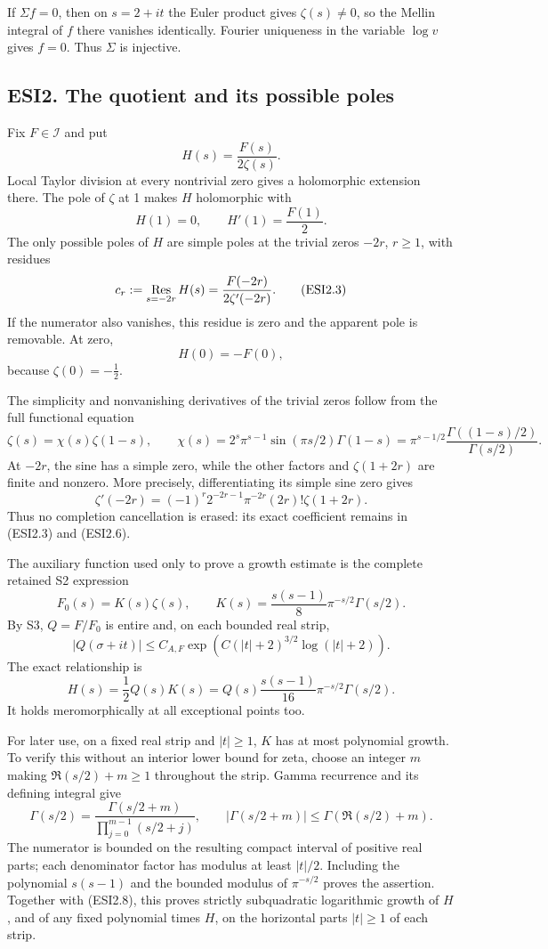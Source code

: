 If \(\Sigma f=0\), then on \(s=2+it\) the Euler product gives
\(\zeta(s)\ne0\), so the Mellin integral of \(f\) there vanishes
identically. Fourier uniqueness in the variable \(\log v\) gives
\(f=0\). Thus \(\Sigma\) is injective.

\subsection{ESI2. The quotient and its possible
poles}\label{esi2.-the-quotient-and-its-possible-poles}

Fix \(F\in\mathcal I\) and put \[
H(s)=\frac{F(s)}{2\zeta(s)}.
\tag{ESI2.1}
\] Local Taylor division at every nontrivial zero gives a holomorphic
extension there. The pole of \(\zeta\) at 1 makes \(H\) holomorphic with
\[
H(1)=0,\qquad H'(1)=\frac{F(1)}2.
\tag{ESI2.2}
\] The only possible poles of \(H\) are simple poles at the trivial
zeros \(-2r\), \(r\ge1\), with residues \[
c_r:=\mathop{\rm Res}_{s=-2r}H(s)
=\frac{F(-2r)}{2\zeta'(-2r)}.
\tag{ESI2.3}
\] If the numerator also vanishes, this residue is zero and the apparent
pole is removable. At zero, \[
H(0)=-F(0),
\tag{ESI2.4}
\] because \(\zeta(0)=-\tfrac12\).

The simplicity and nonvanishing derivatives of the trivial zeros follow
from the full functional equation \[
\zeta(s)=\chi(s)\zeta(1-s),\qquad
\chi(s)=2^s\pi^{s-1}\sin(\pi s/2)\Gamma(1-s)
=\pi^{s-1/2}\frac{\Gamma((1-s)/2)}{\Gamma(s/2)}.
\tag{ESI2.5}
\] At \(-2r\), the sine has a simple zero, while the other factors and
\(\zeta(1+2r)\) are finite and nonzero. More precisely, differentiating
its simple sine zero gives \[
\zeta'(-2r)=(-1)^r2^{-2r-1}\pi^{-2r}(2r)!\zeta(1+2r).
\tag{ESI2.6}
\] Thus no completion cancellation is erased: its exact coefficient
remains in (ESI2.3) and (ESI2.6).

The auxiliary function used only to prove a growth estimate is the
complete retained S2 expression \[
F_0(s)=K(s)\zeta(s),\qquad
K(s)=\frac{s(s-1)}8\pi^{-s/2}\Gamma(s/2).
\tag{ESI2.7}
\] By S3, \(Q=F/F_0\) is entire and, on each bounded real strip, \[
|Q(\sigma+it)|\le C_{A,F}
\exp\!\left(C(|t|+2)^{3/2}\log(|t|+2)\right).
\tag{ESI2.8}
\] The exact relationship is \[
H(s)=\frac12Q(s)K(s)
=Q(s)\frac{s(s-1)}{16}\pi^{-s/2}\Gamma(s/2).
\tag{ESI2.9}
\] It holds meromorphically at all exceptional points too.

For later use, on a fixed real strip and \(|t|\ge1\), \(K\) has at most
polynomial growth. To verify this without an interior lower bound for
zeta, choose an integer \(m\) making \(\Re(s/2)+m\ge1\) throughout the
strip. Gamma recurrence and its defining integral give \[
\Gamma(s/2)=\frac{\Gamma(s/2+m)}{\prod_{j=0}^{m-1}(s/2+j)},
\qquad
|\Gamma(s/2+m)|\le\Gamma(\Re(s/2)+m).
\tag{ESI2.10}
\] The numerator is bounded on the resulting compact interval of
positive real parts; each denominator factor has modulus at least
\(|t|/2\). Including the polynomial \(s(s-1)\) and the bounded modulus
of \(\pi^{-s/2}\) proves the assertion. Together with (ESI2.8), this
proves strictly subquadratic logarithmic growth of \(H\), and of any
fixed polynomial times \(H\), on the horizontal parts \(|t|\ge1\) of
each strip.

